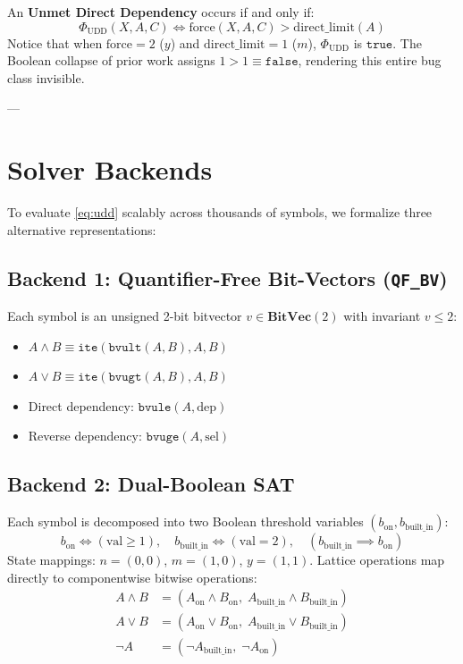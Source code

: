 \documentclass[acmsmall,screen,review,nonacm]{acmart}
\begin{document}
An \textbf{Unmet Direct Dependency} occurs if and only if:
\begin{equation}
\label{eq:udd}
\Phi_{\text{UDD}}(X, A, C) \iff \text{force}(X, A, C) > \text{direct\_limit}(A)
\end{equation}
Notice that when $\text{force} = 2$ ($y$) and $\text{direct\_limit} = 1$ ($m$), $\Phi_{\text{UDD}}$ is $\mathtt{true}$. The Boolean collapse of prior work assigns $1 > 1 \equiv \mathtt{false}$, rendering this entire bug class invisible.

---

\section{Solver Backends}
\label{sec:backends}

To evaluate \cref{eq:udd} scalably across thousands of symbols, we formalize three alternative representations:

\subsection{Backend 1: Quantifier-Free Bit-Vectors (\texttt{QF\_BV})}
Each symbol is an unsigned 2-bit bitvector $v \in \mathbf{BitVec}(2)$ with invariant $v \le 2$:
\begin{itemize}
    \item $A \land B \equiv \mathtt{ite}(\mathtt{bvult}(A, B), A, B)$
    \item $A \lor B \equiv \mathtt{ite}(\mathtt{bvugt}(A, B), A, B)$
    \item Direct dependency: $\mathtt{bvule}(A, \text{dep})$
    \item Reverse dependency: $\mathtt{bvuge}(A, \text{sel})$
\end{itemize}

\subsection{Backend 2: Dual-Boolean SAT}
Each symbol is decomposed into two Boolean threshold variables $(b_{\text{on}}, b_{\text{built\_in}})$:
\begin{equation}
b_{\text{on}} \iff (\text{val} \ge 1), \quad b_{\text{built\_in}} \iff (\text{val} = 2), \quad (b_{\text{built\_in}} \implies b_{\text{on}})
\end{equation}
State mappings: $n = (0, 0)$, $m = (1, 0)$, $y = (1, 1)$. Lattice operations map directly to componentwise bitwise operations:
\begin{align}
A \land B &= (A_{\text{on}} \land B_{\text{on}}, \; A_{\text{built\_in}} \land B_{\text{built\_in}}) \\
A \lor B &= (A_{\text{on}} \lor B_{\text{on}}, \; A_{\text{built\_in}} \lor B_{\text{built\_in}}) \\
\neg A &= (\neg A_{\text{built\_in}}, \; \neg A_{\text{on}})
\end{align}
\end{document}

